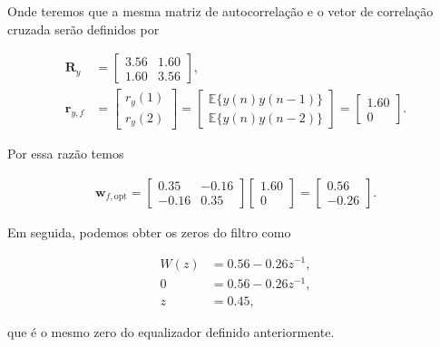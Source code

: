 \documentclass[a4paper,10pt]{article}
\begin{document}
\begin{enumerate}
\begin{enumerate}
						Onde teremos que a mesma matriz de autocorrelação e o vetor de correlação cruzada serão definidos por

						\begin{align}
							\mathbf{R}_{y} &=
							\begin{bmatrix}
								3.56 & 1.60 \\
								1.60 & 3.56
							\end{bmatrix}, \\
							\mathbf{r}_{y,f} &= 
							\begin{bmatrix}
								r_{y}(1) \\
								r_{y}(2)
							\end{bmatrix} =
							\begin{bmatrix}
								\mathbb{E}\{y(n) y(n - 1)\} \\
								\mathbb{E}\{y(n) y(n - 2)\}
							\end{bmatrix} = 
							\begin{bmatrix}
								1.60 \\
								0
							\end{bmatrix}.
						\end{align}

						Por essa razão temos

						\begin{align}
							\mathbf{w}_{f,\text{opt}} = 
							\begin{bmatrix}
								0.35 & -0.16 \\
								-0.16 & 0.35
							\end{bmatrix}
							\begin{bmatrix}
								1.60 \\
								0
							\end{bmatrix} =
							\begin{bmatrix}
								0.56 \\
								-0.26
							\end{bmatrix}.
						\end{align}

						Em seguida, podemos obter os zeros do filtro como

						\begin{align}
							W(z) &= 0.56 - 0.26 z^{-1}, \\
							0 &= 0.56 - 0.26 z^{-1}, \\
							z &= 0.45,
						\end{align}

						que é o mesmo zero do equalizador definido anteriormente.


\end{enumerate}
\end{enumerate}
\end{document}
